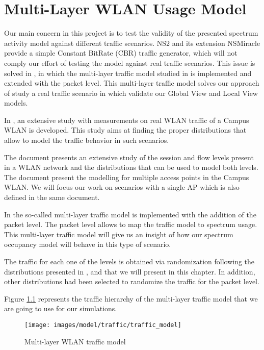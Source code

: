 \chapter{Multi-Layer WLAN Usage Model} \label{chapter:traffic_model}
Our main concern in this project is to test the validity of the presented spectrum activity model against different traffic scenarios. NS2 and its extension NSMiracle provide a simple Constant BitRate (\acs{CBR}) traffic generator, which will not comply our effort of testing the model against real traffic scenarios. This issue is solved in \cite{marcello-thesis}, in which the multi-layer traffic model studied in \cite{Campus-WLAN} is implemented and extended with the packet level. This multi-layer traffic model solves our approach of study a real traffic scenario in which validate our Global View and Local View models. 

In \cite{Campus-WLAN}, an extensive study with measurements on real \acs{WLAN} traffic of a Campus \acs{WLAN} is developed. This study aims at finding the proper distributions that allow to model the traffic behavior in such scenarios. 

The document presents an extensive study of the session and flow levels present in a \acs{WLAN} network and the distributions that can be used to model both levels. The document present the modelling for multiple access points in the Campus \acs{WLAN}. We will focus our work on scenarios with a single \acs{AP} which is also defined in the same document.

In \cite{marcello-thesis} the so-called multi-layer traffic model is implemented with the addition of the packet level. The packet level allows to map the traffic model to spectrum usage. This multi-layer traffic model will give us an insight of how our spectrum occupancy model will behave in this type of scenario.

The traffic for each one of the levels is obtained via randomization following the distributions presented in \cite{Campus-WLAN}, and that we will present in this chapter. In addition, other distributions had been selected to randomize the traffic for the packet level.

Figure \ref{fig:traffic_hierarchy} represents the traffic hierarchy of the multi-layer traffic model that we are going to use for our simulations.

\begin{figure}[h]
	\centering
	\texttt{[image: images/model/traffic/traffic\_model]}
	\caption{Multi-layer WLAN traffic model}
	\label{fig:traffic_hierarchy}
\end{figure}

